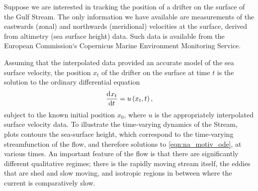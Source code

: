 Suppose we are interested in tracking the position of a drifter on the surface of the Gulf Stream.
The only information we have available are measurements of the eastwards (zonal) and northwards (meridional) velocities at the surface, derived from altimetry (sea surface height) data.
Such data is available from the European Commission`s Copernicus Marine Environment Monitoring Service.

Assuming that the interpolated data provided an accurate model of the sea surface velocity, the position \(x_t\) of the drifter on the surface at time \(t\) is the solution to the ordinary differential equation
\begin{equation}\label{eqn:na_motiv_ode}
	\dod{x_t}{t} = u\left(x_t, t\right),
\end{equation}
subject to the known initial position \(x_0\), where \(u\) is the appropriately interpolated surface velocity data.
To illustrate the time-varying dynamics of the Stream,  plots contours the sea-surface height, which correspond to the time-varying streamfunction of the flow, and therefore solutions to \cref{eqn:na_motiv_ode}, at various times.
An important feature of the flow is that there are significantly different qualitative regimes; there is the rapidly moving stream itself, the eddies that are shed and slow moving, and isotropic regions in between where the current is comparatively slow.


